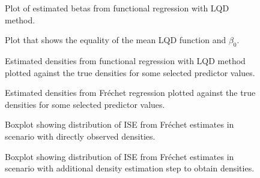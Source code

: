 \begin{figure}[h]
    \centering
    \resizebox{1\textwidth}{!}{}
    \caption[Estimated betas in LQD functional regression]{Plot of estimated betas from
    functional regression with LQD method.}
    \label{fig:betas}
\end{figure}

\begin{figure}[h]
    \centering
    \resizebox{1\textwidth}{!}{}
    \caption[Equality of mean LQD function and $\beta_0$]{Plot that shows the equality
    of the mean LQD function and $\beta_0$.}
    \label{fig:beta0vsmean}
\end{figure}

\begin{figure}[h]
    \centering
    \resizebox{1\textwidth}{!}{}
    \caption[Comparison: estimated vs. true densities --- LQD]{Estimated
    densities from functional regression with LQD method plotted against the true densities for some selected predictor values.}
    \label{fig:func_est_vs_true}
\end{figure}

\begin{figure}[h]
    \centering
    \resizebox{1\textwidth}{!}{}
    \caption[Comparison: estimated vs. true densities --- Fréchet]{Estimated
    densities from Fréchet regression plotted against the true densities for some selected
    predictor values.}
    \label{fig:frechet_est_vs_true}
\end{figure}

\begin{figure}[h]
    \centering
    \resizebox{1\textwidth}{!}{}
    \caption[Simulation results: boxplot ISE Fréchet]{Boxplot showing distribution of
    ISE from Fréchet estimates in scenario with directly observed densities.}
    \label{fig:ise_frechet}
\end{figure}

\begin{figure}[h]
    \centering
    \resizebox{1\textwidth}{!}{}
    \caption[Simulation results: boxplot ISE Fréchet with density estimation]{Boxplot
    showing distribution of ISE from Fréchet estimates in scenario with additional
    density estimation step to obtain densities.}
    \label{fig:ise_frechet_denstimation}
\end{figure}

